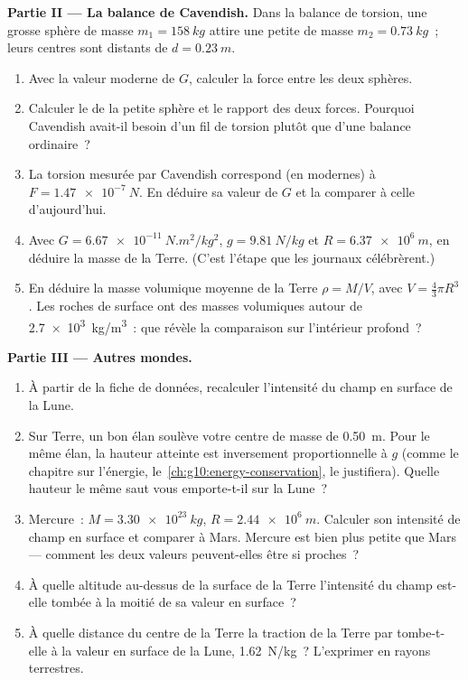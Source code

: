 \begin{problem}
\medskip
\noindent\textbf{Partie II --- La balance de Cavendish.}
Dans la balance de torsion, une grosse sphère de masse
$m_1 = \qty{158}{kg}$ attire une petite de masse
$m_2 = \qty{0.73}{kg}$~; leurs centres sont distants de
$d = \qty{0.23}{m}$.
\begin{enumerate}[resume]
  \item Avec la valeur moderne de $G$, calculer la force entre les
        deux sphères.
  \item Calculer le  de la petite sphère et le rapport des
        deux forces. Pourquoi Cavendish avait-il besoin d'un fil de
        torsion plutôt que d'une balance ordinaire~?
  \item La torsion mesurée par Cavendish correspond (en
         modernes) à $F = \qty{1.47e-7}{N}$. En déduire
        sa valeur de $G$ et la comparer à celle d'aujourd'hui.
  \item Avec $G = \qty{6.67e-11}{N.m^2/kg^2}$, $g = \qty{9.81}{N/kg}$
        et $R = \qty{6.37e6}{m}$, en déduire la masse de la Terre.
        (C'est l'étape que les journaux célébrèrent.)
  \item En déduire la masse volumique moyenne de la Terre
        $\rho = M / V$, avec $V = \frac43 \pi R^3$. Les roches de
        surface ont des masses volumiques autour de
        \qty{2.7e3}{kg/m^3}~: que révèle la comparaison sur
        l'intérieur profond~?
\end{enumerate}

\medskip
\noindent\textbf{Partie III --- Autres mondes.}
\begin{enumerate}[resume]
  \item À partir de la fiche de données, recalculer l'intensité du
        champ en surface de la Lune.
  \item Sur Terre, un bon élan soulève votre centre de masse de
        \qty{0.50}{m}. Pour le même élan, la hauteur atteinte est
        inversement proportionnelle à $g$ (comme le chapitre sur
        l'énergie, le~\cref{ch:g10:energy-conservation}, le
        justifiera). Quelle hauteur le même saut vous emporte-t-il sur
        la Lune~?
  \item Mercure~: $M = \qty{3.30e23}{kg}$, $R = \qty{2.44e6}{m}$.
        Calculer son intensité de champ en surface et comparer à Mars.
        Mercure est bien plus petite que Mars --- comment les deux
        valeurs peuvent-elles être si proches~?
  \item À quelle altitude au-dessus de la surface de la Terre
        l'intensité du champ est-elle tombée à la moitié de sa valeur
        en surface~?
  \item À quelle distance du centre de la Terre la traction de la
        Terre par  tombe-t-elle à la valeur en surface
        de la Lune, \qty{1.62}{N/kg}~? L'exprimer en rayons
        terrestres.
\end{enumerate}


\end{problem}
